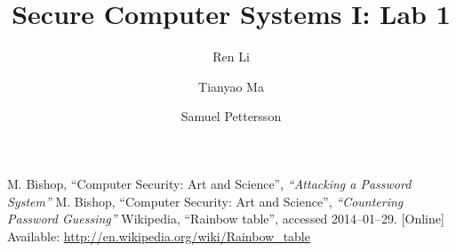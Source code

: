 \documentclass{article}
\title{\textbf{Secure Computer Systems I: Lab 1}}
\author{Ren Li \and Tianyao Ma \and Samuel Pettersson}
\begin{document}
\maketitle



\begin{thebibliography}{9}
  M. Bishop,
  ``Computer Security: Art and Science'',
  \textit{``Attacking a Password System''}
  M. Bishop,
  ``Computer Security: Art and Science'',
  \textit{``Countering Password Guessing''}
  Wikipedia,
  ``Rainbow table'',
  accessed 2014--01--29.
  [Online]
  Available: \url{http://en.wikipedia.org/wiki/Rainbow_table}
\end{thebibliography}
\end{document}
